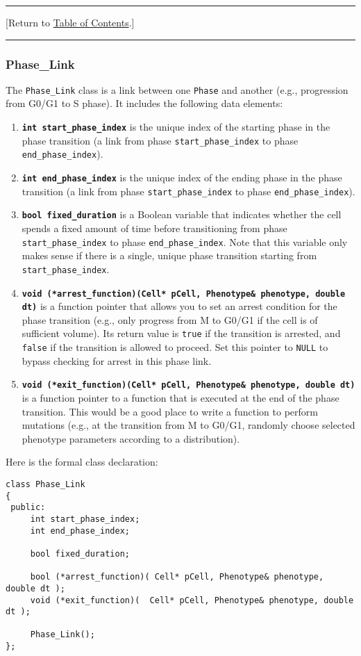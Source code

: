 \documentclass[12pt]{article}
\renewcommand{\v}{\verb}
\newcommand{\smallcode}[1]{\textbf{\texttt{#1}}}
\newcommand{\blue}[1]{\textcolor{blue}{#1}}
\newcommand{\DONE}{}%
\newcommand{\TOClink}{\begin{center}\hrule\vskip-5pt\phantom{.}\hfill[Return to \hyperlink{TOC}{Table of Contents}.]\hfill\phantom{.}\vskip3pt\hrule\end{center}}
\begin{document}
\TOClink 

\subsubsection{Phase\_Link \DONE}
\label{sec:Phase_Link}
The \v|Phase_Link| class is a link between one \v|Phase| and another (e.g., progression from G0/G1 to S phase). 
It includes the following data elements: 

\begin{enumerate}
\item
\smallcode{int start\_phase\_index} is the unique index of the starting phase in the phase transition 
(a link from phase 
\v|start_phase_index| to phase \v|end_phase_index|). 

\item
\smallcode{int end\_phase\_index} is the unique index of the ending phase in the phase transition 
(a link from phase 
\v|start_phase_index| to phase \v|end_phase_index|). 

\item
\smallcode{bool fixed\_duration} is a Boolean variable that indicates whether the cell spends a fixed amount 
of time before transitioning from phase 
\v|start_phase_index| to phase \v|end_phase_index|. Note that this variable only 
makes sense if there is a single, unique phase transition starting from 
\v|start_phase_index|. 

\item 
\smallcode{void (*arrest\_function)(Cell* pCell, Phenotype\& phenotype, double dt)} is a function pointer that allows you to 
set an arrest condition for the phase transition  
(e.g., only progress from M to G0/G1 if the cell is of sufficient volume). 
Its return value is \v|true| if the transition is 
arrested, and \v|false| if the transition is allowed to proceed. Set this pointer to \v|NULL| 
to bypass checking for arrest in this phase link. 

\item 
\smallcode{void (*exit\_function)(Cell* pCell, Phenotype\& phenotype, double dt)} is a function pointer to a function that is 
executed at the end of the phase transition. This would be a good place to write a function to 
perform mutations (e.g., at the transition from M to G0/G1, randomly choose selected phenotype 
parameters according to a distribution). 
\end{enumerate}

Here is the formal class declaration:
\begin{verbatim}
class Phase_Link
{
 public:
     int start_phase_index;
     int end_phase_index; 
     
     bool fixed_duration; 
     
     bool (*arrest_function)( Cell* pCell, Phenotype& phenotype, double dt ); 
     void (*exit_function)(  Cell* pCell, Phenotype& phenotype, double dt ); 
     
     Phase_Link(); 
};
\end{verbatim}
\end{document}
